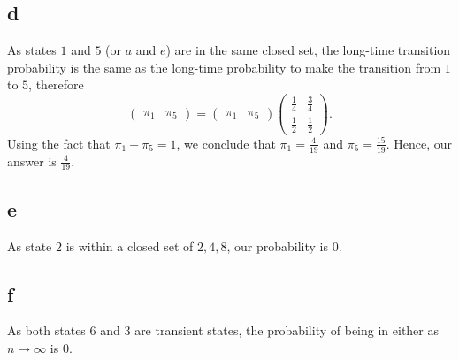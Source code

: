 \documentclass{article}
\begin{document}
\subsection{d}
As states $1$ and $5$ (or $a$ and $e$) are in the same closed set, the long-time transition probability is the same as the long-time probability to make the transition from $1$ to $5$, therefore
\begin{equation}
    \begin{pmatrix}
        \pi_1 & \pi_5
    \end{pmatrix} = 
    \begin{pmatrix}
        \pi_1 & \pi_5
    \end{pmatrix}
    \begin{pmatrix}
        \frac{1}{4} & \frac{3}{4} \\
        \frac{1}{2} & \frac{1}{2}
    \end{pmatrix}.
\end{equation}
Using the fact that $\pi_1 + \pi_5 = 1$, we conclude that $\pi_1 = \frac{4}{19}$ and $\pi_5 = \frac{15}{19}$. Hence, our answer is $\frac{4}{19}$.

\subsection{e}
As state $2$ is within a closed set of ${2,4,8}$, our probability is $0$.

\subsection{f}
As both states $6$ and $3$ are transient states, the probability of being in either as $n\to\infty$ is $0$.
\end{document}
